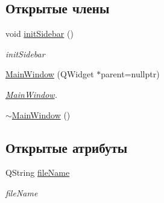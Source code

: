 \subsection*{Открытые члены}
\begin{DoxyCompactItemize}
\item 
void \hyperlink{classMainWindow_a3dea38a93f87d0ee9452035a4c9b8b7b}{init\+Sidebar} ()
\begin{DoxyCompactList}\small\item\em init\+Sidebar \end{DoxyCompactList}\item 
\hyperlink{classMainWindow_a996c5a2b6f77944776856f08ec30858d}{Main\+Window} (Q\+Widget $\ast$parent=nullptr)
\begin{DoxyCompactList}\small\item\em \hyperlink{classMainWindow}{Main\+Window}. \end{DoxyCompactList}\item 
\hyperlink{classMainWindow_ae98d00a93bc118200eeef9f9bba1dba7}{$\sim$\+Main\+Window} ()
\end{DoxyCompactItemize}
\subsection*{Открытые атрибуты}
\begin{DoxyCompactItemize}
\item 
Q\+String \hyperlink{classMainWindow_a06968aebc42a16ab51c5888b4784075d}{file\+Name}
\begin{DoxyCompactList}\small\item\em file\+Name \end{DoxyCompactList}\end{DoxyCompactItemize}
